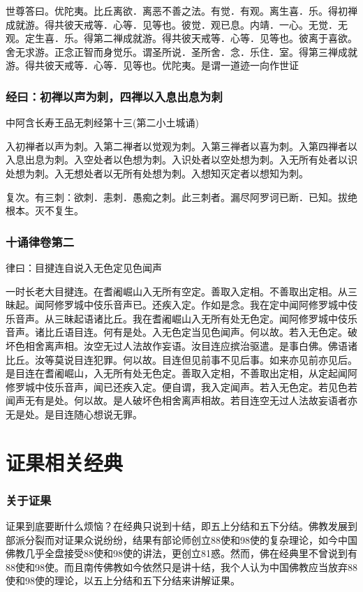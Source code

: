\documentclass{book}
\begin{document}
世尊答曰。优陀夷。比丘离欲．离恶不善之法。有觉．有观。离生喜．乐。得初禅成就游。得共彼天戒等．心等．见等也。彼觉．观已息。内靖．一心。无觉．无观。定生喜．乐。得第二禅成就游。得共彼天戒等．心等．见等也。彼离于喜欲。舍无求游。正念正智而身觉乐。谓圣所说．圣所舍．念．乐住．室。得第三禅成就游。得共彼天戒等．心等．见等也。优陀夷。是谓一道迹一向作世证

\subsection{经曰：初禅以声为刺，四禅以入息出息为刺}

中阿含长寿王品无刺经第十三(第二小土城诵)

入初禅者以声为刺。入第二禅者以觉观为刺。入第三禅者以喜为刺。入第四禅者以入息出息为刺。入空处者以色想为刺。入识处者以空处想为刺。入无所有处者以识处想为刺。入无想处者以无所有处想为刺。入想知灭定者以想知为刺。

复次。有三刺：欲刺．恚刺．愚痴之刺。此三刺者。漏尽阿罗诃已断．已知。拔绝根本。灭不复生。

\subsection{十诵律卷第二}

律曰：目揵连自说入无色定见色闻声

一时长老大目揵连。在耆阇崛山入无所有空定。善取入定相。不善取出定相。从三昧起。闻阿修罗城中伎乐音声已。还疾入定。作如是念。我在定中闻阿修罗城中伎乐音声。从三昧起语诸比丘。我在耆阇崛山入无所有处无色定。闻阿修罗城中伎乐音声。诸比丘语目连。何有是处。入无色定当见色闻声。何以故。若入无色定。破坏色相舍离声相。汝空无过人法故作妄语。汝目连应摈治驱遣。是事白佛。佛语诸比丘。汝等莫说目连犯罪。何以故。目连但见前事不见后事。如来亦见前亦见后。是目连在耆阇崛山，入无所有处无色定。善取入定相，不善取出定相，从定起闻阿修罗城中伎乐音声，闻已还疾入定。便自谓，我入定闻声。若入无色定。若见色若闻声无有是处。何以故。是人破坏色相舍离声相故。若目连空无过人法故妄语者亦无是处。是目连随心想说无罪。

\chapter{证果相关经典}

\subsection{关于证果}

证果到底要断什么烦恼？在经典只说到十结，即五上分结和五下分结。佛教发展到部派分裂而对证果众说纷纷，结果有部论师创立88使和98使的复杂理论，如今中国佛教几乎全盘接受88使和98使的讲法，更创立81惑。然而，佛在经典里不曾说到有88使和98使。而且南传佛教如今依然只是讲十结，我个人认为中国佛教应当放弃88使和98使的理论，以五上分结和五下分结来讲解证果。
\end{document}
